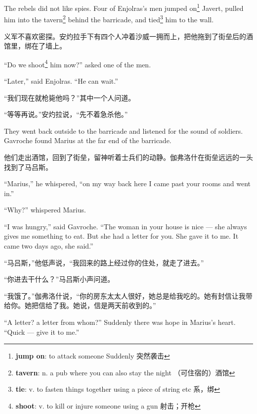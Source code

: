 \documentclass[fontset=ubuntu, zihao=5]{ctexart}
\begin{document}
\begin{paracol}{2}
\switchcolumn*

The rebels did not like spies. Four of Enjolras's men jumped
on\footnote{\textbf{jump on}: to attack someone Suddenly 突然袭击} Javert,
pulled him into the tavern\footnote{\textbf{tavern}: n. a pub where you can
  also stay the night （可住宿的）酒馆} behind the barricade, and
tied\footnote{\textbf{tie}: v. to fasten things together using a piece of
  string etc 系，绑} him to the wall.

\switchcolumn

义军不喜欢密探。安灼拉手下有四个人冲着沙威一拥而上，把他拖到了街垒后的酒馆里，绑在了墙上。

\switchcolumn*

``Do we shoot\footnote{\textbf{shoot}: v. to kill or injure someone using a
  gun 射击；开枪} him now?'' asked one of the men.

``Later,'' said Enjolras. ``He can wait.''

\switchcolumn

“我们现在就枪毙他吗？”其中一个人问道。

“等等再说。”安灼拉说，“先不着急杀他。”

\switchcolumn*

They went back outside to the barricade and listened for the sound of soldiers. Gavroche found Marius at the far end of the barricade.

\switchcolumn

他们走出酒馆，回到了街垒，留神听着士兵们的动静。伽弗洛什在街垒远远的一头找到了马吕斯。

\switchcolumn*

``Marius,'' he whispered, ``on my way back here I came past your rooms and went in.''

``Why?'' whispered Marius.

``I was hungry,'' said Gavroche. ``The woman in your house is nice --- she always gives me something to eat. But she had a letter for you. She gave it to me. It came two days ago, she said.''


\switchcolumn

“马吕斯，”他低声说，“我回来的路上经过你的住处，就走了进去。”

“你进去干什么？”马吕斯小声问道。

“我饿了。”伽弗洛什说，“你的房东太太人很好，她总是给我吃的。她有封信让我带给你。她把信给了我。她说，信是两天前收到的。”

\switchcolumn*

``A letter? a letter from whom?'' Suddenly there was hope in Marius's heart. ``Quick --- give it to me.''



\end{paracol}
\end{document}

